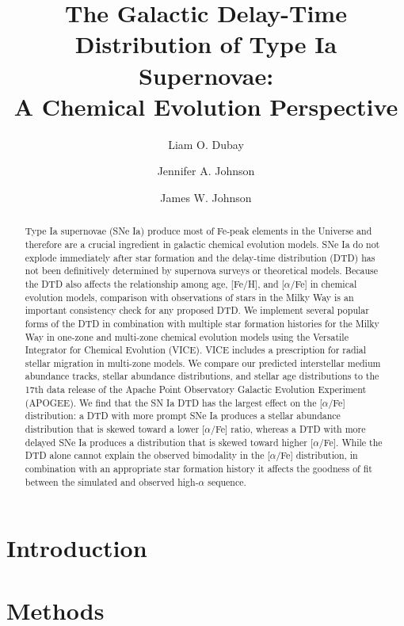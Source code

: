 \documentclass[twocolumn,linenumbers,twocolappendix]{aastex631}
\begin{document}
\title{The Galactic Delay-Time Distribution of Type Ia Supernovae:\\
       A Chemical Evolution Perspective}

\author[0000-0003-3781-0747]{Liam O. Dubay}
\author[0000-0001-7258-1834]{Jennifer A. Johnson}
\author[0000-0002-6534-8783]{James W. Johnson}

\begin{abstract}
    Type Ia supernovae (SNe Ia) produce most of Fe-peak elements in the Universe and therefore are a crucial ingredient in galactic chemical evolution models. SNe Ia do not explode immediately after star formation and the delay-time distribution (DTD) has not been definitively determined by supernova surveys or theoretical models. Because the DTD also affects the relationship among age, [Fe/H], and [$\alpha$/Fe] in chemical evolution models, comparison with observations of stars in the Milky Way is an important consistency check for any proposed DTD. We implement several popular forms of the DTD in combination with multiple star formation histories for the Milky Way in one-zone and multi-zone chemical evolution models using the Versatile Integrator for Chemical Evolution (VICE). VICE includes a prescription for radial stellar migration in multi-zone models. We compare our predicted interstellar medium abundance tracks, stellar abundance distributions, and stellar age distributions to the 17th data release of the Apache Point Observatory Galactic Evolution Experiment (APOGEE). We find that the SN Ia DTD has the largest effect on the [$\alpha$/Fe] distribution: a DTD with more prompt SNe Ia produces a stellar abundance distribution that is skewed toward a lower [$\alpha$/Fe] ratio, whereas a DTD with more delayed SNe Ia produces a distribution that is skewed toward higher [$\alpha$/Fe]. While the DTD alone cannot explain the observed bimodality in the [$\alpha$/Fe] distribution, in combination with an appropriate star formation history it affects the goodness of fit between the simulated and observed high-$\alpha$ sequence.
\end{abstract}

\section{Introduction}

\section{Methods}
\label{sec:methods}
\end{document}
